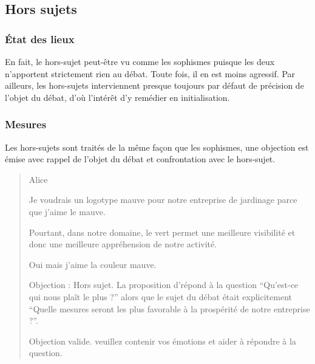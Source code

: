 \subsection{Hors sujets}
\subsubsection{État des lieux}
En fait, le hors-sujet peut-être vu comme les sophismes puisque les deux n’apportent strictement rien au débat. Toute fois, il en est moins agressif. Par ailleurs, les hors-sujets interviennent presque toujours par défaut de précision de l’objet du débat, d’où l’intérêt d’y remédier en initialisation.

\subsubsection{Mesures}
Les hors-sujets sont traités de la même façon que les sophismes, une objection est émise avec rappel de l’objet du débat et confrontation avec le hors-sujet.

\begin{quote}
  \begin{drama}{0cm}{0cm}{Alice}

    \Aspeaks       Je voudrais un logotype mauve pour notre entreprise de jardinage parce que j’aime le mauve.

    \Bspeaks       Pourtant, dans notre domaine, le vert permet une meilleure visibilité et donc une meilleure appréhension de notre activité.

    \Aspeaks       Oui mais j’aime la couleur mauve.

    \Bspeaks       Objection : Hors sujet. La proposition d’\A répond à la question \enquote{Qu’est-ce qui nous plaît le plus ?} alors que le sujet du débat était explicitement \enquote{Quelle mesures seront les plus favorable à la prospérité de notre entreprise ?}.

    \Arbitrespeaks Objection valide. \A veuillez contenir vos émotions et aider à répondre à la question.

  \end{drama}
\end{quote}
